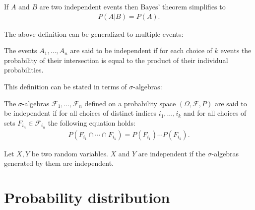     \begin{result}
        If $A$ and $B$ are two independent events then Bayes' theorem simplifies to
        \begin{gather}
            P(A|B) = P(A).
        \end{gather}
    \end{result}
    The above definition can be generalized to multiple events:
    \begin{definition}
        The events $A_1,\ldots,A_n$ are said to be independent if for each choice of $k$ events the probability of their intersection is equal to the product of their individual probabilities.
    \end{definition}
    This definition can be stated in terms of $\sigma$-algebras:
    \begin{definition}
        The $\sigma$-algebras $\mathcal{F}_1,\ldots,\mathcal{F}_n$ defined on a probability space $(\Omega,\mathcal{F},P)$ are said to be independent if for all choices of distinct indices $i_1,\ldots,i_k$ and for all choices of sets $F_{i_n}\in\mathcal{F}_{i_n}$ the following equation holds:
        \begin{gather}
            \label{prob:independent_sigma_algebras}
            P(F_{i_1}\cap\cdots\cap F_{i_k}) = P(F_{i_1})\cdots P(F_{i_k}).
        \end{gather}
    \end{definition}
    \begin{result}
        Let $X,Y$ be two random variables. $X$ and $Y$ are independent if the $\sigma$-algebras generated by them are independent.
    \end{result}

\section{Probability distribution}


